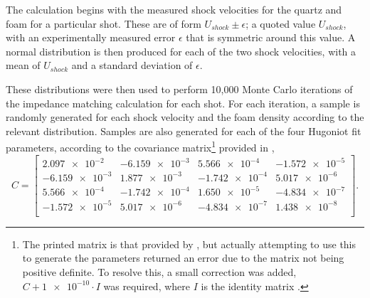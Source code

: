 
The calculation begins with the measured shock velocities for the quartz and foam for a particular shot. These are of form $U_{shock} \pm \epsilon$; a quoted value $U_{shock}$, with an experimentally measured error $\epsilon$ that is symmetric around this value. A normal distribution is then produced for each of the two shock velocities, with a mean of $U_{shock}$ and a standard deviation of $\epsilon$. 

These distributions were then used to perform 10,000 Monte Carlo iterations of the impedance matching calculation for each shot. For each iteration, a sample is randomly generated for each shock velocity and the foam density according to the relevant distribution. Samples are also generated for each of the four Hugoniot fit parameters, according to the covariance matrix\footnote{The printed matrix is that provided by \cite{Knudson2013}, but actually attempting to use this to generate the parameters returned an error due to the matrix not being positive definite. To resolve this, a small correction was added, $C + \num{1e-10}\cdot I$ was required, where $I$ is the identity matrix \cite{Holton2003}.} provided in \cite{Knudson2013},
\[C = 
\begin{bmatrix}
\num{2.097e-2} & \num{-6.159e-3} & \num{5.566e-4} & \num{-1.572 e-5}\\
\num{-6.159e-3} & \num{1.877e-3} & \num{-1.742e-4} & \num{5.017e-6}\\
\num{5.566e-4} & \num{-1.742e-4} & \num{1.650e-5} & \num{-4.834e-7}\\
\num{-1.572 e-5} & \num{5.017e-6} & \num{-4.834e-7} & \num{1.438e-8}\\
\end{bmatrix}. 	
\]

